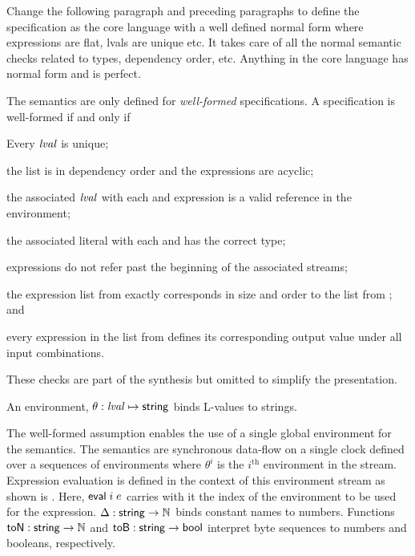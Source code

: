 Change the following paragraph and preceding paragraphs to define the specification as the core language with a well defined normal form where expressions are flat, lvals are unique etc. 
It takes care of all the normal semantic checks related to types, dependency order, etc. 
Anything in the core language has normal form and is perfect.

The semantics are only defined for \emph{well-formed} specifications. 
A specification is well-formed if and only if
\begin{compactenum}
\item Every $\mathit{lval}$ is unique;
\item the  list is in dependency order and the expressions are acyclic;
\item the associated $\mathit{lval}$ with each  and  expression is a valid reference in the environment;
\item the associated literal with each  and  has the correct type;
\item {} expressions do not refer past the beginning of the associated streams;
\item the expression list from  exactly corresponds in size and order to the list from ; and
\item every expression in the list from  defines its corresponding output value under all input combinations.
\end{compactenum}
These checks are part of the synthesis but omitted to simplify the presentation.

An environment, $\theta: \mathit{lval} \mapsto \mathsf{string}$ binds L-values to strings. 

The well-formed assumption enables the use of a single global environment for the semantics. 
The semantics are synchronous data-flow on a single clock defined over a sequences of environments where $\theta^i$ is the $i^\mathrm{th}$ environment in the stream. 
Expression evaluation is defined in the context of this environment stream as shown is . 
Here, $\mathsf{eval}\; i\; e$ carries with it the index of the environment to be used for the expression. 
$\Delta : \mathsf{string} \to \mathbb{N}$ binds constant names to numbers. 
Functions $\mathsf{toN}:\mathsf{string}\to\mathbb{N}$ and $\mathsf{toB}:\mathsf{string}\to\mathsf{bool}$ interpret byte sequences to numbers and booleans, respectively. 

